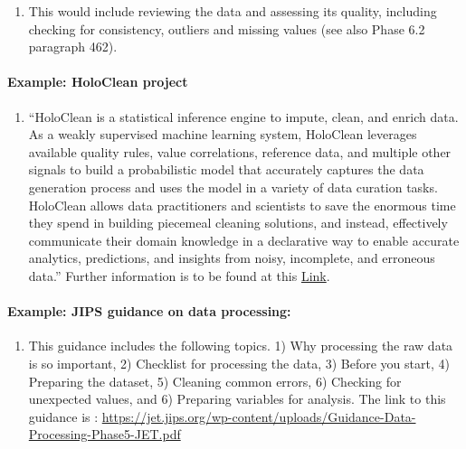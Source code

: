 \documentclass[
]{article}
\providecommand{\tightlist}{%
  \setlength{\itemsep}{0pt}\setlength{\parskip}{0pt}}
\begin{document}
\begin{enumerate}
\def\labelenumi{\arabic{enumi}.}
\setcounter{enumi}{381}
\tightlist
\item
  This would include reviewing the data and assessing its quality,
  including checking for consistency, outliers and missing values (see
  also Phase 6.2 paragraph 462).
\end{enumerate}

\hypertarget{example-holoclean-project-1}{%
\paragraph{Example: HoloClean project}\label{example-holoclean-project-1}}

\begin{enumerate}
\def\labelenumi{\arabic{enumi}.}
\setcounter{enumi}{382}
\tightlist
\item
  ``HoloClean is a statistical inference engine to impute, clean, and
  enrich data. As a weakly supervised machine learning system,
  HoloClean leverages available quality rules, value correlations,
  reference data, and multiple other signals to build a probabilistic
  model that accurately captures the data generation process and uses
  the model in a variety of data curation tasks. HoloClean allows data
  practitioners and scientists to save the enormous time they spend in
  building piecemeal cleaning solutions, and instead, effectively
  communicate their domain knowledge in a declarative way to enable
  accurate analytics, predictions, and insights from noisy,
  incomplete, and erroneous data.'' Further information is to be found
  at this \href{http://www.holoclean.io/}{Link}.
\end{enumerate}

\hypertarget{example-jips-guidance-on-data-processing-1}{%
\paragraph{\texorpdfstring{Example: JIPS guidance on data processing: {}}{Example: JIPS guidance on data processing: }}\label{example-jips-guidance-on-data-processing-1}}

\begin{enumerate}
\def\labelenumi{\arabic{enumi}.}
\setcounter{enumi}{383}
\tightlist
\item
  This guidance includes the following topics. 1) Why processing the
  raw data is so important, 2) Checklist for processing the data, 3)
  Before you start, 4) Preparing the dataset, 5) Cleaning common
  errors, 6) Checking for unexpected values, and 6) Preparing
  variables for analysis. The link to this guidance is : {}
  \url{https://jet.jips.org/wp-content/uploads/Guidance-Data-Processing-Phase5-JET.pdf}
\end{enumerate}
\end{document}
